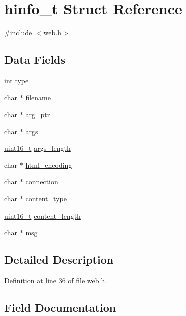 \hypertarget{structhinfo__t}{}\section{hinfo\+\_\+t Struct Reference}
\label{structhinfo__t}


{\ttfamily \#include $<$web.\+h$>$}

\subsection*{Data Fields}
\begin{DoxyCompactItemize}
\item 
int \hyperlink{structhinfo__t_a4e896141431943909a71282fc56799fb}{type}
\item 
char $\ast$ \hyperlink{structhinfo__t_a874ffdf5ade4e3844d7719444495e89c}{filename}
\item 
char $\ast$ \hyperlink{structhinfo__t_a0d27c1b7d2730373f93342961b9cb18d}{arg\+\_\+ptr}
\item 
char $\ast$ \hyperlink{structhinfo__t_a62bf198b939a9d932bcac763ebc51443}{args}
\item 
\hyperlink{send_8c_a273cf69d639a59973b6019625df33e30}{uint16\+\_\+t} \hyperlink{structhinfo__t_a003130c9489dfe54a76df23a85fae62f}{args\+\_\+length}
\item 
char $\ast$ \hyperlink{structhinfo__t_ac03bcdde52e49a14bf9112f295f216b5}{html\+\_\+encoding}
\item 
char $\ast$ \hyperlink{structhinfo__t_a3fbd7d81842222192fe8e8570451e89f}{connection}
\item 
char $\ast$ \hyperlink{structhinfo__t_a87bad5ce6af7ed3613a61d01aef94d8d}{content\+\_\+type}
\item 
\hyperlink{send_8c_a273cf69d639a59973b6019625df33e30}{uint16\+\_\+t} \hyperlink{structhinfo__t_a6cf5714c0fe8e8e7f7819194274f9052}{content\+\_\+length}
\item 
char $\ast$ \hyperlink{structhinfo__t_a06469570091ad74724457998e07d5b56}{msg}
\end{DoxyCompactItemize}


\subsection{Detailed Description}


Definition at line 36 of file web.\+h.



\subsection{Field Documentation}
